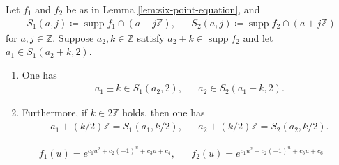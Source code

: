 \documentclass[10pt,a4paper]{amsart}
\DeclareMathOperator{\supp}{supp}
\begin{document}
\begin{lemma}
   \label{lem:supp-arithmetic-progression}

Let $ f_1 $ and $ f_2 $ be as in Lemma \ref{lem:six-point-equation}, and
\begin{align}
    S_1 ( a , j ) \coloneqq \supp f_1 \cap ( a + j \mathbb{ Z } ), & &
    S_2 ( a , j ) \coloneqq \supp f_2 \cap ( a + j \mathbb{ Z } ) \label{eq:supp-arithmetic-progression-S-define}
\end{align}
for $ a , j \in \mathbb{ Z } $.
Suppose $ a_2 , k \in \mathbb{ Z } $ satisfy $ a_2 \pm k \in \supp f_2 $ and let $ a_1 \in S_1 ( a_2 + k , 2 ) $.

\begin{enumerate}
    \item \label{item:supp-arithmetic-progression-supp}

    One has
    \begin{align}
        a_1 \pm k \in S_1 ( a_2 , 2 ), & &
        a_2 \in S_2 ( a_1 + k , 2 ). \label{eq:supp-arithmetic-progression-supp-include}
    \end{align}

\item \label{item:supp-arithmetic-progression-main}

Furthermore, if $ k \in 2 \mathbb{ Z } $ holds, then one has
\begin{align}
    a_1 + ( k / 2 ) \mathbb{ Z } = S_1 ( a_1 , k / 2 ), & &
    a_2 + ( k / 2 ) \mathbb{ Z } = S_2 ( a_2 , k / 2 ).
\end{align}

\end{enumerate}

\end{lemma}

\begin{align}
  f_1 ( u )
  = e^{ c_1 u^2 + c_2 ( - 1 )^u + c_3 u + c_4 }, & &
  f_2 ( u )
  = e^{ c_1 u^2 - c_2 ( - 1 )^u + c_5 u + c_6 } \label{eq:supp-all-Gauss-represent}
\end{align}
\end{document}
